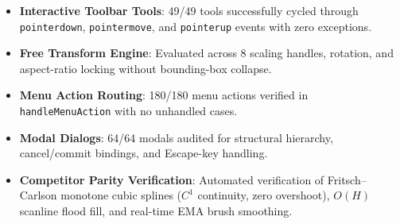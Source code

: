 \documentclass[10pt,journal,compsoc]{IEEEtran}
\begin{document}
\begin{itemize}
    \item \textbf{Interactive Toolbar Tools}: 49/49 tools successfully cycled through \texttt{pointerdown}, \texttt{pointermove}, and \texttt{pointerup} events with zero exceptions.
    \item \textbf{Free Transform Engine}: Evaluated across 8 scaling handles, rotation, and aspect-ratio locking without bounding-box collapse.
    \item \textbf{Menu Action Routing}: 180/180 menu actions verified in \texttt{handleMenuAction} with no unhandled cases.
    \item \textbf{Modal Dialogs}: 64/64 modals audited for structural hierarchy, cancel/commit bindings, and Escape-key handling.
    \item \textbf{Competitor Parity Verification}: Automated verification of Fritsch--Carlson monotone cubic splines ($C^1$ continuity, zero overshoot), $O(H)$ scanline flood fill, and real-time EMA brush smoothing.
\end{itemize}
\end{document}
